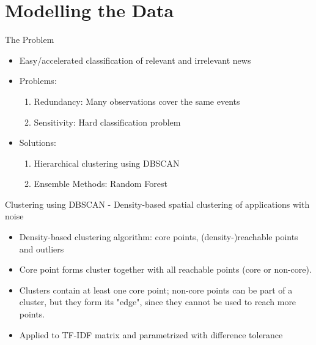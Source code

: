 \documentclass{beamer}
\begin{document}
\section{Modelling the Data}
\begin{frame}{The Problem}
\begin{itemize}

\item Easy/accelerated classification of relevant and irrelevant news
\item Problems:
	\begin{enumerate}
		\item Redundancy: Many observations cover the same events
		\item Sensitivity: Hard classification problem
	\end{enumerate}

\item Solutions: 
	\begin{enumerate}
		\item Hierarchical clustering using DBSCAN
		\item Ensemble Methods: Random Forest
	\end{enumerate}

\end{itemize}
\end{frame}

\begin{frame}{Clustering using DBSCAN - Density-based spatial clustering of applications with noise}

\begin{itemize}
	\item Density-based clustering algorithm: core points, (density-)reachable points and outliers
	\item Core point forms cluster together with all reachable points (core or non-core).
	\item Clusters contain at least one core point; non-core points can be part of a cluster, but they form its "edge", since they cannot be used to reach more points.
	\item Applied to TF-IDF matrix and parametrized with difference tolerance 
\end{itemize}

\end{frame}
\end{document}
